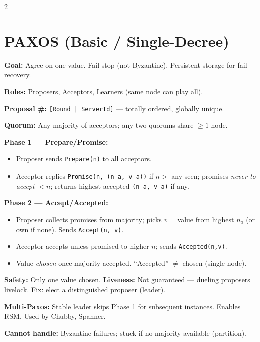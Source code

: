 \documentclass[9pt]{article}
\begin{document}
\fontsize{7.77}{9.32}\selectfont
\begin{multicols*}{2}

\section*{PAXOS (Basic / Single-Decree)}

\textbf{Goal:} Agree on one value. Fail-stop (not Byzantine). Persistent storage for fail-recovery.

\textbf{Roles:} Proposers, Acceptors, Learners (same node can play all).

\textbf{Proposal \#:} \texttt{[Round | ServerId]} — totally ordered, globally unique.

\textbf{Quorum:} Any majority of acceptors; any two quorums share $\ge 1$ node.

\textbf{Phase 1 — Prepare/Promise:}
\begin{itemize}
  \item Proposer sends \texttt{Prepare(n)} to all acceptors.
  \item Acceptor replies \texttt{Promise(n, (n\_a, v\_a))} if $n >$ any seen; promises \emph{never to accept} $< n$; returns highest accepted \texttt{(n\_a, v\_a)} if any.
\end{itemize}

\textbf{Phase 2 — Accept/Accepted:}
\begin{itemize}
  \item Proposer collects promises from majority; picks $v$ = value from highest $n_a$ (or own if none). Sends \texttt{Accept(n, v)}.
  \item Acceptor accepts unless promised to higher $n$; sends \texttt{Accepted(n,v)}.
  \item Value \emph{chosen} once majority accepted. ``Accepted'' $\ne$ chosen (single node).
\end{itemize}

\textbf{Safety:} Only one value chosen. \textbf{Liveness:} Not guaranteed — dueling proposers livelock. Fix: elect a distinguished proposer (leader).

\textbf{Multi-Paxos:} Stable leader skips Phase 1 for subsequent instances. Enables RSM. Used by Chubby, Spanner.

\textbf{Cannot handle:} Byzantine failures; stuck if no majority available (partition).


\end{multicols*}
\end{document}
